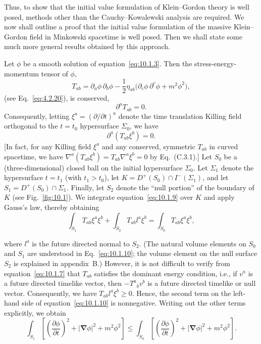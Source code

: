 Thus, to show that the initial value formulation of Klein--Gordon theory is well posed,
methods other than the Cauchy--Kowalewski analysis are required. We now shall
outline a proof that the initial value formulation of the massive Klein--Gordon field
in Minkowski spacetime is well posed. Then we shall state some much more general
results obtained by this approach.

Let \(\phi\) be a smooth solution of equation~\eqref{eq:10.1.3}. Then the
stress-energy-momentum tensor of \(\phi\),
\begin{equation}
  T_{ab}=\partial_a\phi\,\partial_b\phi
  -\frac12\eta_{ab}\bigl(\partial_c\phi\,\partial^c\phi+m^2\phi^2\bigr),
  \tag{10.1.7}\label{eq:10.1.7}
\end{equation}
(see Eq.~\eqref{eq:4.2.20}), is conserved,
\begin{equation}
  \partial^aT_{ab}=0.
  \tag{10.1.8}\label{eq:10.1.8}
\end{equation}
Consequently, letting \(\xi^a=(\partial/\partial t)^a\) denote the time translation
Killing field orthogonal to the \(t=t_0\) hypersurface \(\Sigma_0\), we have
\begin{equation}
  \partial^a(T_{ab}\xi^b)=0.
  \tag{10.1.9}\label{eq:10.1.9}
\end{equation}
[In fact, for any Killing field \(\xi^a\) and any conserved, symmetric \(T_{ab}\) in
curved spacetime, we have \(\nabla^a(T_{ab}\xi^b)=T_{ab}\nabla^a\xi^b=0\) by
Eq.~(C.3.1).] Let \(S_0\) be a (three-dimensional) closed ball on the initial
hypersurface \(\Sigma_0\). Let \(\Sigma_1\) denote the hypersurface \(t=t_1\)
(with \(t_1>t_0\)), let \(K=D^+(S_0)\cap I^-(\Sigma_1)\), and let
\(S_1=D^+(S_0)\cap\Sigma_1\). Finally, let \(S_2\) denote the ``null portion'' of
the boundary of \(K\) (see Fig.~\ref{fig:10.1}). We integrate
equation~\eqref{eq:10.1.9} over \(K\) and apply Gauss's law, thereby obtaining
\begin{equation}
  \int_{S_1}T_{ab}\xi^a\xi^b
  +\int_{S_2}T_{ab}l^a\xi^b
  =\int_{S_0}T_{ab}\xi^a\xi^b,
  \tag{10.1.10}\label{eq:10.1.10}
\end{equation}

where \(l^a\) is the future directed normal to \(S_2\). (The natural volume elements
on \(S_0\) and \(S_1\) are understood in Eq.~\eqref{eq:10.1.10}; the volume
element on the null surface \(S_2\) is explained in appendix~B.) However, it is not
difficult to verify from equation~\eqref{eq:10.1.7} that \(T_{ab}\) satisfies the
dominant energy condition, i.e., if \(v^a\) is a future directed timelike vector, then
\(-T^a{}_bv^b\) is a future directed timelike or null vector. Consequently, we have
\(T_{ab}l^a\xi^b\geq0\). Hence, the second term on the left-hand side of
equation~\eqref{eq:10.1.10} is nonnegative. Writing out the other terms explicitly,
we obtain
\begin{equation}
  \int_{S_1}\left[
    \left(\frac{\partial\phi}{\partial t}\right)^2
    +|\boldsymbol{\nabla}\phi|^2+m^2\phi^2\right]
  \leq
  \int_{S_0}\left[
    \left(\frac{\partial\phi}{\partial t}\right)^2
    +|\boldsymbol{\nabla}\phi|^2+m^2\phi^2\right].
  \tag{10.1.11}\label{eq:10.1.11}
\end{equation}

